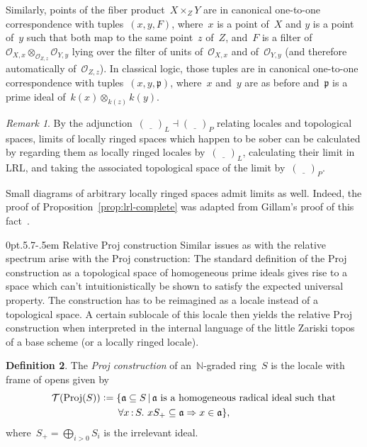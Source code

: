 \documentclass[10pt,reqno,a4paper]{amsbook}
\makeatletter
\theoremstyle{definition}
\newtheorem{defn}{Definition}[section]
\theoremstyle{plain}
\theoremstyle{remark}
\newtheorem{rem}[defn]{Remark}
\renewcommand{\O}{\mathcal{O}}
\newcommand{\T}{\mathcal{T}}
\newcommand{\NN}{\mathbb{N}}
\newcommand{\aaa}{\mathfrak{a}}
\newcommand{\ppp}{\mathfrak{p}}
\newcommand{\placeholder}{\underline{\quad}}
\newcommand{\LRL}{\mathrm{LRL}}
\DeclareMathOperator{\Proj}{Proj}
\newcommand{\Open}{\T}
\newcommand{\?}{\,{:}\,}
\renewcommand{\_}{\mathpunct{.}\,}
\newcommand{\defeq}{\vcentcolon=}
\def\subsection{\@startsection{subsection}{2}%
  {0pt}{.5\linespacing\@plus.7\linespacing}{-.5em}%
  {\normalfont\bfseries}}
\makeatother
\begin{document}
Similarly, points of the fiber product~$X \times_Z Y$ are in canonical
one-to-one correspondence with tuples~$(x,y,F)$, where~$x$ is a point of~$X$
and $y$ is a point of~$y$ such that both map to the same point~$z$ of~$Z$,
and~$F$ is a filter of~$\O_{X,x} \otimes_{\O_{Z,z}} \O_{Y,y}$ lying over the
filter of units of~$\O_{X,x}$ and of~$\O_{Y,y}$ (and therefore automatically
of~$\O_{Z,z}$). In classical logic, those tuples are in canonical one-to-one
correspondence with tuples~$(x,y,\ppp)$, where~$x$ and~$y$ are as before
and~$\ppp$ is a prime ideal of~$k(x) \otimes_{k(z)} k(y)$.

\begin{rem}By the adjunction~$(\placeholder)_L \dashv (\placeholder)_P$
relating locales and topological spaces, limits of locally ringed spaces which
happen to be sober can be calculated by regarding them as locally ringed
locales by~$(\placeholder)_L$, calculating their limit in~$\LRL$, and taking
the associated topological space of the limit by~$(\placeholder)_P$.

Small diagrams of arbitrary locally ringed spaces admit limits as well.
Indeed, the proof of Proposition~\ref{prop:lrl-complete} was adapted from
Gillam's proof of this fact~\cite[Corollary~5]{gillam:localization}.\end{rem}


\subsection{Relative Proj construction} Similar issues as with the relative
spectrum arise with the Proj construction: The standard definition of the Proj
construction as a topological space of homogeneous prime ideals gives rise to a
space which can't intuitionistically be shown to satisfy the expected
universal property. The construction has to be reimagined as a locale
instead of a topological space. A certain sublocale of this locale then yields
the relative Proj construction when interpreted in the internal language of
the little Zariski topos of a base scheme (or a locally ringed locale).

\begin{defn}The \emph{Proj construction} of an~$\NN$-graded ring~$S$ is the
locale with frame of opens given by
\begin{multline*}
  \qquad\Open(\Proj(S)) \defeq
    \{ \aaa \subseteq S \,|\,
      \text{$\aaa$ is a homogeneous radical ideal such that} \\
  \forall x\?S\_
    x S_+ \subseteq \aaa \Rightarrow x \in \aaa \},\qquad
\end{multline*}
where~$S_+ = \bigoplus_{i > 0} S_i$ is the irrelevant ideal.
\end{defn}
\end{document}
